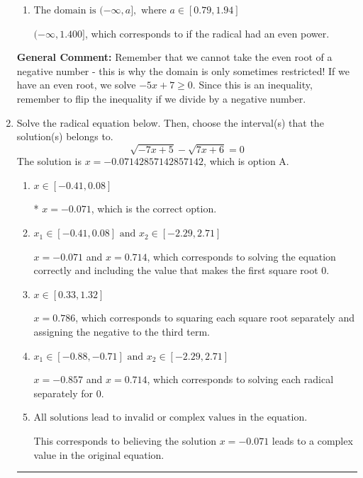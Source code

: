 \documentclass{extbook}[14pt]
\newcommand{\litem}[1]{\item #1

\rule{\textwidth}{0.4pt}}
\begin{document}
\begin{enumerate}
{\begin{enumerate}[label=\Alph*.]
$[1.400, \infty)$, which corresponds to if the radical had an even power AND reversing the direction of the domain.
\item \( \text{The domain is } (-\infty, a], \text{   where } a \in [0.79, 1.94] \)

$(-\infty, 1.400]$, which corresponds to if the radical had an even power.
\end{enumerate}

\textbf{General Comment:} Remember that we cannot take the even root of a negative number - this is why the domain is only sometimes restricted! If we have an even root, we solve $-5 x + 7 \geq 0$. Since this is an inequality, remember to flip the inequality if we divide by a negative number.
}
\litem{
Solve the radical equation below. Then, choose the interval(s) that the solution(s) belongs to.
\[ \sqrt{-7 x + 5} - \sqrt{7 x + 6} = 0 \]
The solution is \( x = -0.07142857142857142 \), which is option A.\begin{enumerate}[label=\Alph*.]
\item \( x \in [-0.41,0.08] \)

* $x = -0.071$, which is the correct option.
\item \( x_1 \in [-0.41, 0.08] \text{ and } x_2 \in [-2.29,2.71] \)

$x = -0.071$ and $x = 0.714$, which corresponds to solving the equation correctly and including the value that makes the first square root 0.
\item \( x \in [0.33,1.32] \)

$x = 0.786$, which corresponds to squaring each square root separately and assigning the negative to the third term.
\item \( x_1 \in [-0.88, -0.71] \text{ and } x_2 \in [-2.29,2.71] \)

$x = -0.857$ and $x = 0.714$, which corresponds to solving each radical separately for 0.
\item \( \text{All solutions lead to invalid or complex values in the equation.} \)

This corresponds to believing the solution $x = -0.071$ leads to a complex value in the original equation.
\end{enumerate}

}
\end{enumerate}
\end{document}

